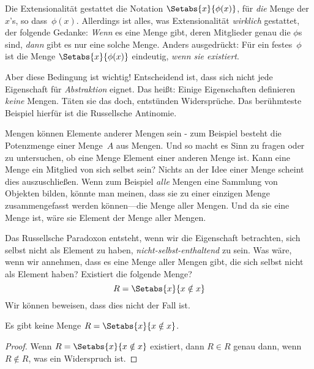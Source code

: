 \documentclass[../../../include/open-logic-section]{subfiles}
\begin{document}

Die Extensionalität gestattet die Notation $\Setabs{x}{\phi(x)}$, für
\emph{die} Menge der $x$'s, so dass~$\phi(x)$. Allerdings ist alles, was
Extensionalität \emph{wirklich} gestattet, der folgende Gedanke:
\emph{Wenn} es eine Menge gibt, deren Mitglieder genau die $\phi$s sind,
\emph{dann} gibt es nur eine solche Menge. Anders ausgedrückt: Für ein festes~$\phi$
ist die Menge $\Setabs{x}{\phi(x)}$ eindeutig, \emph{wenn sie
existiert}.

Aber diese Bedingung ist wichtig!{} Entscheidend ist, dass sich nicht jede Eigenschaft
für \emph{Abstraktion} eignet. Das heißt: Einige Eigenschaften definieren \emph{keine} Mengen.
Täten sie das doch, entstünden Widersprüche. Das berühmteste Beispiel hierfür ist die Russellsche
Antinomie.

Mengen können Elemente anderer Mengen sein - zum Beispiel besteht die Potenzmenge
einer Menge~$A$ aus Mengen. Und so macht es Sinn zu fragen oder
zu untersuchen, ob eine Menge Element einer anderen Menge ist. Kann eine Menge
ein Mitglied von sich selbst sein? Nichts an der Idee einer Menge scheint dies auszuschließen.
Wenn zum Beispiel \emph{alle} Mengen eine Sammlung von
Objekten bilden, könnte man meinen, dass sie zu einer einzigen Menge
zusammengefasst werden können---die Menge aller Mengen. 
Und da sie eine Menge ist, wäre sie Element der Menge aller Mengen. 

Das Russellsche Paradoxon entsteht, wenn wir die Eigenschaft betrachten,
sich selbst nicht als Element zu haben, \emph{nicht-selbst-enthaltend} zu sein.
Was wäre, wenn wir annehmen,
dass es eine Menge aller Mengen gibt, die sich selbst nicht als
Element haben? Existiert die folgende Menge?
\[
R = \Setabs{x}{x \notin x}
\]
 Wir können beweisen, dass dies nicht der Fall ist.

\begin{thm}
	Es gibt keine Menge $R = \Setabs{x}{x \notin x}$.
\end{thm}

\begin{proof}
Wenn $R = \Setabs{x}{x \notin x}$ existiert, dann
$R \in R$ genau dann, wenn $R \notin R$, was ein Widerspruch ist.
\end{proof}
\end{document}
